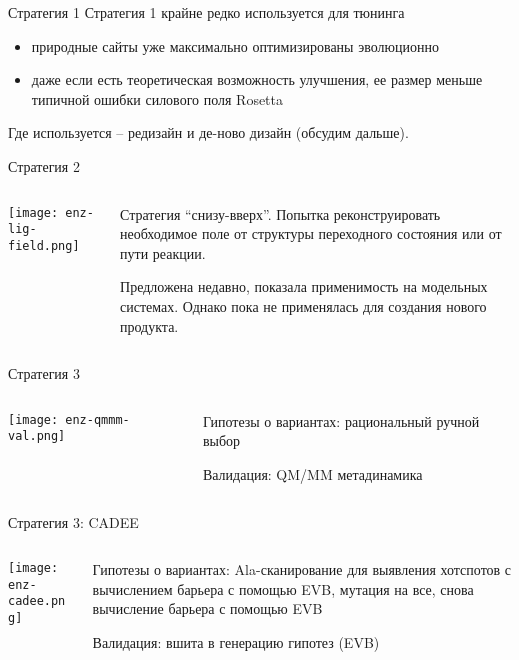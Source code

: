 \begin{frame}{Стратегия 1}
    Стратегия 1 крайне редко используется для тюнинга
    \begin{itemize}
        \item природные сайты уже максимально оптимизированы эволюционно
        \item даже если есть теоретическая возможность улучшения, ее размер меньше типичной ошибки силового поля Rosetta
    \end{itemize}
    Где используется – редизайн и де-ново дизайн (обсудим дальше).
\end{frame}

\begin{frame}{Стратегия 2}
\begin{columns}
\begin{column}{0.7\textwidth}
    \texttt{[image: enz-lig-field.png]}
\end{column}
\begin{column}{0.3\textwidth}
    Стратегия “снизу-вверх”. Попытка реконструировать необходимое поле от структуры переходного состояния или от пути реакции.


Предложена недавно, показала применимость на модельных системах. Однако пока не применялась для создания нового продукта.
\end{column}
\end{columns}
\end{frame}

\begin{frame}{Стратегия 3}
\begin{columns}
\begin{column}{0.7\textwidth}
    \texttt{[image: enz-qmmm-val.png]}
\end{column}
\begin{column}{0.3\textwidth}
    Гипотезы о вариантах: рациональный ручной выбор

Валидация: QM/MM метадинамика
\end{column}
\end{columns}
\end{frame}

\begin{frame}{Стратегия 3: CADEE}
\begin{columns}
\begin{column}{0.4\textwidth}
    \texttt{[image: enz-cadee.png]}
\end{column}
\begin{column}{0.4\textwidth}
    Гипотезы о вариантах: Ala-сканирование для выявления хотспотов с вычислением барьера с помощью EVB, мутация на все, снова вычисление барьера с помощью EVB

Валидация: вшита в генерацию гипотез (EVB)
\end{column}
\end{columns}
\end{frame}


